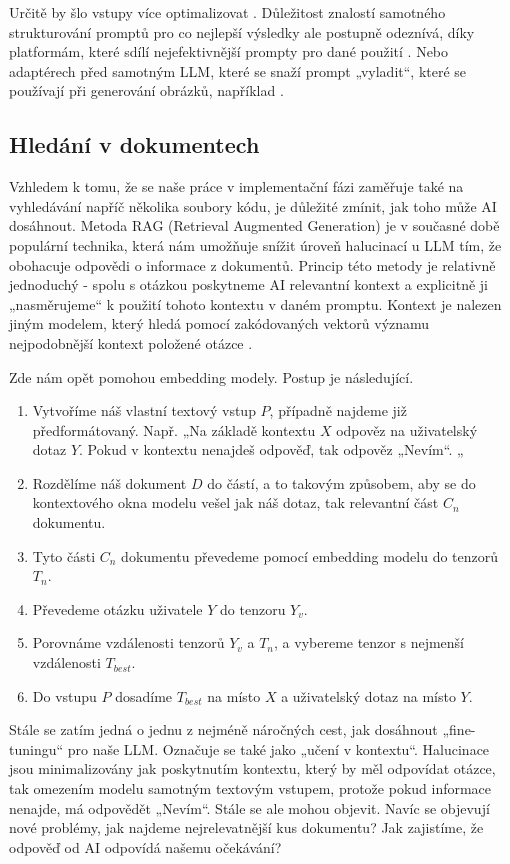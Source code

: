 \documentclass[FM,DP]{tulthesis}
\begin{document}
		Určitě by šlo vstupy více optimalizovat \cite{PEG}. Důležitost znalostí samotného strukturování promptů pro co nejlepší výsledky ale postupně odeznívá, díky platformám, které sdílí nejefektivnější prompty pro dané použití \cite{langchainhub}. Nebo adaptérech před samotným LLM, které se snaží prompt „vyladit“, které se používají při generování obrázků, například \cite{leonardoai}.
		
		\subsection{Hledání v dokumentech}
		Vzhledem k tomu, že se naše práce v implementační fázi zaměřuje také na vyhledávání napříč několika soubory kódu, je důležité zmínit, jak toho může AI dosáhnout. Metoda RAG (Retrieval Augmented Generation) je v současné době populární technika, která nám umožňuje snížit úroveň halucinací u LLM tím, že obohacuje odpovědi o informace z dokumentů. Princip této metody je relativně jednoduchý - spolu s otázkou poskytneme AI relevantní kontext a explicitně ji „nasměrujeme“ k použití tohoto kontextu v daném promptu. Kontext je nalezen jiným modelem, který hledá pomocí zakódovaných vektorů významu nejpodobnější kontext položené otázce \cite{paper:RAG}.
		
		Zde nám opět pomohou embedding modely. Postup je následující.
		\begin{enumerate}
			\item Vytvoříme náš vlastní textový vstup $P$, případně najdeme již předformátovaný. Např. „Na základě kontextu $X$ odpověz na uživatelský dotaz $Y$. Pokud v kontextu nenajdeš odpověď, tak odpověz „Nevím“. „
			\item Rozdělíme náš dokument $D$ do částí, a to takovým způsobem, aby se do kontextového okna modelu vešel jak náš dotaz, tak relevantní část $C_n$ dokumentu.
			\item Tyto části $C_n$ dokumentu převedeme pomocí embedding modelu do tenzorů $T_n$.
			\item Převedeme otázku uživatele $Y$ do tenzoru $Y_v$.
			\item Porovnáme vzdálenosti tenzorů $Y_v$ a $T_n$, a vybereme tenzor s nejmenší vzdálenosti $T_{best}$. 
			\item Do vstupu $P$ dosadíme $T_{best}$ na místo $X$ a uživatelský dotaz na místo $Y$.
		\end{enumerate}
		
		Stále se zatím jedná o jednu z nejméně náročných cest, jak dosáhnout „fine-tuningu“ pro naše LLM. Označuje se také jako „učení v kontextu“. Halucinace jsou minimalizovány jak poskytnutím kontextu, který by měl odpovídat otázce, tak omezením modelu samotným textovým vstupem, protože pokud informace nenajde, má odpovědět „Nevím“. Stále se ale mohou objevit. Navíc se objevují nové problémy, jak najdeme nejrelevatnější kus dokumentu? Jak zajistíme, že odpověď od AI odpovídá našemu očekávání?
		
\end{document}
